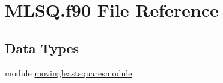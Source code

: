\hypertarget{MLSQ_8f90}{\section{M\+L\+S\+Q.\+f90 File Reference}
\label{MLSQ_8f90}
}
\subsection*{Data Types}
\begin{DoxyCompactItemize}
\item 
module \hyperlink{classmovingleastsquaresmodule}{movingleastsquaresmodule}
\end{DoxyCompactItemize}
